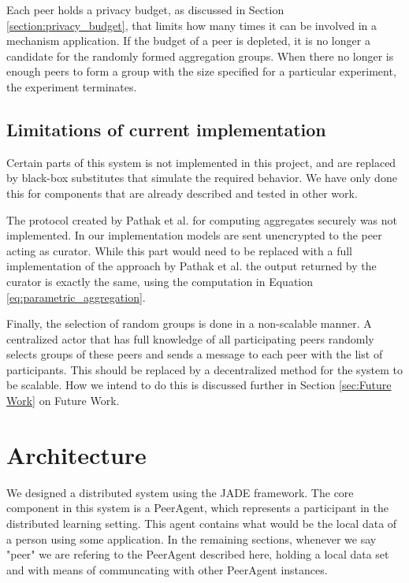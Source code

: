 Each peer holds a privacy budget, as discussed in Section \ref{section:privacy_budget}, that limits how many times it can be involved in a mechanism application. If the budget of a peer is depleted, it is no longer a candidate for the randomly formed aggregation groups. When there no longer is enough peers to form a group with the size specified for a particular experiment, the experiment terminates.

\subsection{Limitations of current implementation}

Certain parts of this system is not implemented in this project, and are replaced by black-box substitutes that simulate the required behavior. We have only done this for components that are already described and tested in other work. 

The protocol created by Pathak et al. for computing aggregates securely was not implemented. In our implementation models are sent unencrypted to the peer acting as curator. While this part would need to be replaced with a full implementation of the approach by Pathak et al. the output returned by the curator is exactly the same, using the computation in Equation \ref{eq:parametric_aggregation}. 

Finally, the selection of random groups is done in a non-scalable manner. A centralized actor that has full knowledge of all participating peers randomly selects groups of these peers and sends a message to each peer with the list of participants. This should be replaced by a decentralized method for the system to be scalable. How we intend to do this is discussed further in Section \ref{sec:Future Work} on Future Work.


\section{Architecture}

We designed a distributed system using the JADE framework. The core component in this system is a PeerAgent, which represents a participant in the distributed learning setting. This agent contains what would be the local data of a person using some application. In the remaining sections, whenever we say "peer" we are refering to the PeerAgent described here, holding a local data set and with means of communcating with other PeerAgent instances.


